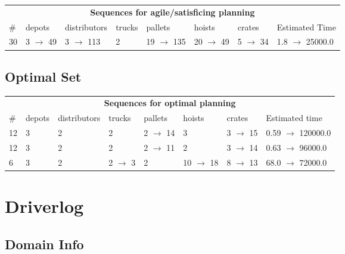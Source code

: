 \documentclass{article}
\begin{document}
                        \begin{center}
                        \begin{tabular}{l|l|l|l|l|l|l|l}
                        \multicolumn{8}{c}{\bf \large Sequences for agile/satisficing planning}\\
                        \# & depots & distributors & trucks & pallets & hoists & crates & Estimated Time\\\midrule
                        30&3 $\rightarrow$ 49&3 $\rightarrow$ 113&2&19 $\rightarrow$ 135&20 $\rightarrow$ 49&5 $\rightarrow$ 34&1.8 $\rightarrow$ 25000.0
                        \end{tabular}
                        \end{center}
                    
                            \subsection*{Optimal Set}

                            \begin{center}
                            \begin{tabular}{l|l|l|l|l|l|l|l}
                            \multicolumn{8}{c}{\bf \large Sequences for optimal planning}\\
                            \# & depots & distributors & trucks & pallets & hoists & crates & Estimated time\\\midrule
                            12&3&2&2&2 $\rightarrow$ 14&3&3 $\rightarrow$ 15&0.59 $\rightarrow$ 120000.0\\
12&3&2&2&2 $\rightarrow$ 11&2&3 $\rightarrow$ 14&0.63 $\rightarrow$ 96000.0\\
6&3&2&2 $\rightarrow$ 3&2&10 $\rightarrow$ 18&8 $\rightarrow$ 13&68.0 $\rightarrow$ 72000.0
                            \end{tabular}
                            \end{center}
                    \newpage \section{Driverlog}
                    \subsection*{Domain Info}
\end{document}
